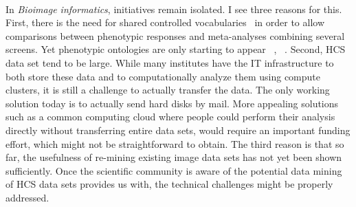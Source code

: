 \paragraph*{}
In \textit{Bioimage informatics}, initiatives remain isolated. I see
three reasons for this. First, there is the need for shared controlled
vocabularies~\cite{pmid18603566} in order to allow comparisons between
phenotypic responses and meta-analyses combining several screens. Yet
phenotypic ontologies are only starting to appear 
~\cite{hoehndorf2012semantic}, ~\cite{kirsanova2015cellular}. 
Second, HCS data set tend to be large. While many institutes have the
IT infrastructure to both store these data and to computationally
analyze them using compute clusters, it is still a challenge to
actually transfer the data. The only working solution today is to
actually send hard disks by mail. More appealing solutions such as a
common computing cloud where people could perform their analysis
directly without transferring entire data sets, would require an
important funding effort, which might not be straightforward to
obtain. The third reason is that so far, the usefulness of re-mining
existing image data sets has not yet been shown sufficiently. Once the
scientific community is aware of the potential data mining of
HCS data sets provides us with, the technical challenges might be
properly addressed. 

%

%



